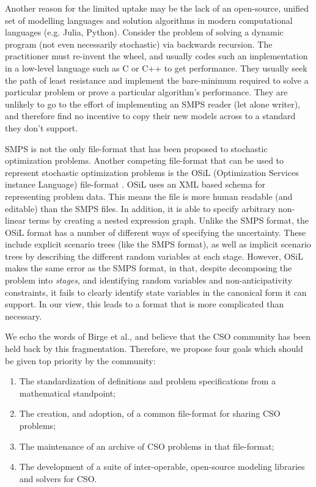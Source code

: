 \documentclass[final,1p,times]{elsarticle}
\begin{document}
Another reason for the limited uptake may be the lack of an open-source, unified set of modelling languages and solution algorithms in modern computational languages (e.g. Julia, Python). Consider the problem of solving a dynamic program (not even necessarily stochastic) via backwards recursion. The practitioner must re-invent the wheel, and usually codes such an implementation in a low-level language such as C or C++ to get performance. They usually seek the path of least resistance and implement the bare-minimum required to solve a particular problem or prove a particular algorithm's performance. They are unlikely to go to the effort of implementing an SMPS reader (let alone writer), and therefore find no incentive to copy their new models across to a standard they don't support.

SMPS is not the only file-format that has been proposed to stochastic optimization problems. Another competing file-format that can be used to represent stochastic optimization problems is the OSiL (Optimization Services instance Language) file-format \cite{fourer_xml-based_2009}. OSiL uses an XML based schema for representing problem data. This means the file is more human readable (and editable) than the SMPS files. In addition, it is able to specify arbitrary non-linear terms by creating a nested expression graph. Unlike the SMPS format, the OSiL format has a number of different ways of specifying the uncertainty. These include explicit scenario trees (like the SMPS format), as well as implicit scenario trees by describing the different random variables at each stage. However, OSiL makes the same error as the SMPS format, in that, despite decomposing the problem into \emph{stages}, and identifying random variables and non-anticipativity constraints, it fails to clearly identify state variables in the canonical form it can support. In our view, this leads to a format that is more complicated than necessary.

We echo the words of Birge et al., and believe that the CSO community has been held back by this fragmentation. Therefore, we propose four goals which should be given top priority by the community:

\begin{enumerate}
    \item The standardization of definitions and problem specifications from a mathematical standpoint;
    \item The creation, and adoption, of a common file-format for sharing CSO problems;
    \item The maintenance of an archive of CSO problems in that file-format;
    \item The development of a suite of inter-operable, open-source modeling libraries and solvers for CSO.
\end{enumerate}
\end{document}
